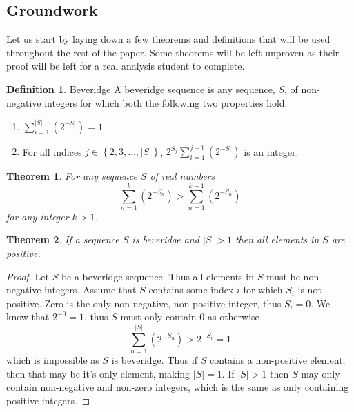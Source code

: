 \documentclass{macjourn}
\def\useLim{}
\newcommand{\sumfrom}[3]{\sum\useLim_{#1}^{#2} \left( {#3} \right)}
\newcommand{\set}[1]{\left\{ {#1} \right\}}
\newcommand{\cardinality}[1]{\left| #1 \right|}
\newtheorem{theorem}{Theorem}[subsection]
\theoremstyle{definition}
\newtheorem{definition}{Definition}[subsection]
\begin{document}
	\subsection{Groundwork}
	Let us start by laying down a few theorems and definitions that will be used throughout the rest of the paper. Some theorems will be left unproven as their proof will be left for a real analysis student to complete.
	
	
	\begin{definition}{Beveridge}
		A beveridge sequence is any sequence, $S$, of non-negative integers for which both the following two properties hold.
		\begin{enumerate}
			\item $\sumfrom{i=1}{\cardinality{S}}{2^{-S_i}} = 1$
			\item For all indices $j \in \set{2,3,\ldots,\cardinality{S}}$, $2^{S_j}\sumfrom{i=1}{j-1}{2^{-S_i}}$ is an integer.
		\end{enumerate}
	\end{definition}
	
	\begin{theorem} \label{increasing}
		For any sequence $S$ of real numbers \[\sumfrom{n=1}{k}{2^{-S_n}} > \sumfrom{n=1}{k-1}{2^{-S_n}}\]
		for any integer $k > 1$.
	\end{theorem}
	
	\begin{theorem}	\label{positive}
		If a sequence $S$ is beveridge and $\cardinality{S} > 1$ then all elements in $S$ are positive.
	\end{theorem}
	
	\begin{proof}
		Let $S$ be a beveridge sequence. Thus all elements in $S$ must be non-negative integers. Assume that $S$ contains some index $i$ for which $S_i$ is not positive. Zero is the only non-negative, non-positive integer, thus $S_i = 0$. We know that $2^{-0} = 1$, thus $S$ must only contain $0$ as otherwise \[\sumfrom{n=1}{\cardinality{S}}{2^{-S_n}} > 2^{-S_i} = 1\] which is impossible as $S$ is beveridge. Thus if $S$ contains a non-positive element, then that may be it's only element, making $\cardinality{S} = 1$. If $\cardinality{S} > 1$ then $S$ may only contain non-negative and non-zero integers, which is the same as only containing positive integers.
	\end{proof}
	
\end{document}
